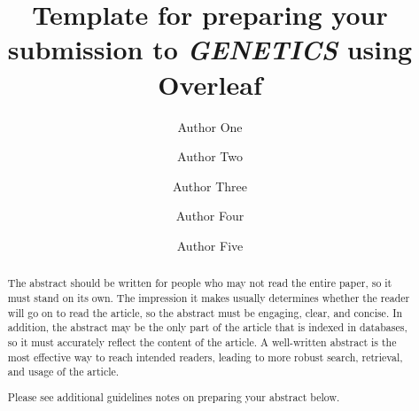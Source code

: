 \documentclass{gsajnl}
\begin{document}

\usepackage{epstopdf}



\title{Template for preparing your submission to \textit{GENETICS} using Overleaf}

\author[1,$\dagger$]{Author One}
\author[1]{Author Two}
\author[2]{Author Three}
\author[2,3]{Author Four}
\author[4,$\ast$]{Author Five}




\begin{abstract}
The abstract should be written for people who may not read the entire paper, so it must stand on its own. The impression it makes usually determines whether the reader will go on to read the article, so the abstract must be engaging, clear, and concise. In addition, the abstract may be the only part of the article that is indexed in databases, so it must accurately reflect the content of the article. A well-written abstract is the  most effective way to reach intended readers, leading to more robust search, retrieval, and usage of the article.

Please see additional guidelines notes on preparing your abstract below.
\end{abstract}


\end{document}
